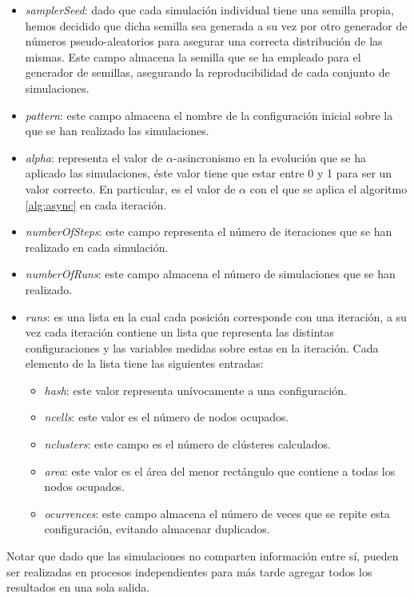 \documentclass[../proyecto.tex]{memoir}
\begin{document}
\begin{itemize}
\item \textit{samplerSeed}: dado que cada simulación individual tiene una semilla propia, hemos decidido que dicha semilla sea generada a su vez por otro generador de números pseudo-aleatorios para asegurar una correcta distribución de las mismas. Este campo almacena la semilla que se ha empleado para el generador de semillas, asegurando la reproducibilidad de cada conjunto de simulaciones.
\item \textit{pattern}: este campo almacena el nombre de la configuración inicial sobre la que se han realizado las simulaciones.
\item \textit{alpha}: representa el valor de $\alpha$-asincronismo en la evolución que se ha aplicado las simulaciones, éste valor tiene que estar entre 0 y 1 para ser un valor correcto. En particular, es el valor de $\alpha$ con el que se aplica el algoritmo \ref{alg:async} en cada iteración.
\item \textit{numberOfSteps}: este campo representa el número de iteraciones que se han realizado en cada simulación.
\item \textit{numberOfRuns}: este campo almacena el número de simulaciones que se han realizado.
\item \textit{runs}: es una lista en la cual cada posición corresponde con una iteración, a su vez cada iteración contiene un lista que representa las distintas configuraciones y las variables medidas sobre estas en la iteración. Cada elemento de la lista tiene las siguientes entradas:
\begin{itemize}
	\item \textit{hash}: este valor representa unívocamente a una configuración.
	\item \textit{ncells}: este valor es el número de nodos ocupados.
	\item \textit{nclusters}: este campo es el número de clústeres calculados.
	\item \textit{area}: este valor es el área del menor rectángulo que contiene a todas los nodos ocupados.
	\item \textit{ocurrences}: este campo almacena el número de veces que se repite esta configuración, evitando almacenar duplicados.
\end{itemize}
\end{itemize}


Notar que dado que las simulaciones no comparten información entre sí, pueden ser realizadas en procesos independientes para más tarde agregar todos los resultados en una sola salida.
\end{document}
